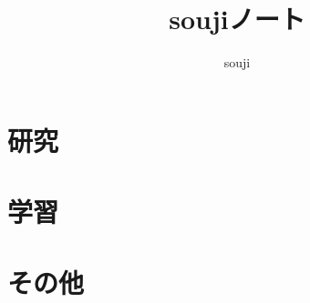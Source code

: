 \documentclass[a4j,dvipdfmx,10pt]{jbook}
\title{soujiノート}
\author{souji}
\date{}
\begin{document}
\frontmatter

\maketitle



\setcounter{tocdepth}{2}
\tableofcontents

\mainmatter

\part{研究}\label{part:研究}

\part{学習}\label{part:学習}

\part{その他}\label{part:その他}






\backmatter


\renewcommand{\bibname}{参考文献}




\printindex
\end{document}
